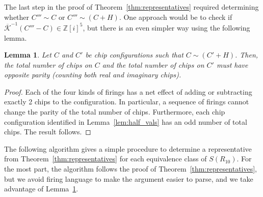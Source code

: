 \documentclass[12p]{amsart}
\numberwithin{equation}{section}
\theoremstyle{plain}
\newtheorem{lemma}[thm]{Lemma}
\theoremstyle{definition}
\begin{document}
The last step in the proof of Theorem~\ref{thm:representatives} required determining whether $C''' \sim C$ or $C''' \sim (C + H)$. One approach would be to check if $\overline{\mathcal K}^{-1}(C''' - C) \in \mathbb Z[i]^5$, but there is an even simpler way using the following lemma. 

\begin{lemma}\label{lem:parity}
    Let $C$ and $C'$ be chip configurations such that $C \sim (C' + H)$. Then, the total number of chips on $C$ and the total number of chips on $C'$ must have opposite parity (counting both real and imaginary chips). 
\end{lemma}
\begin{proof}
    Each of the four kinds of firings has a net effect of adding or subtracting exactly 2 chips to the configuration. In particular, a sequence of firings cannot change the parity of the total number of chips. Furthermore, each chip configuration identified in Lemma~\ref{lem:half_vals} has an odd number of total chips. The result follows. 
\end{proof}

The following algorithm gives a simple procedure to determine a representative from Theorem~\ref{thm:representatives} for each equivalence class of $S(R_{10})$. For the most part, the algorithm follows the proof of Theorem~\ref{thm:representatives}, but we avoid firing language to make the argument easier to parse, and we take advantage of Lemma~\ref{lem:parity}. 
\end{document}

